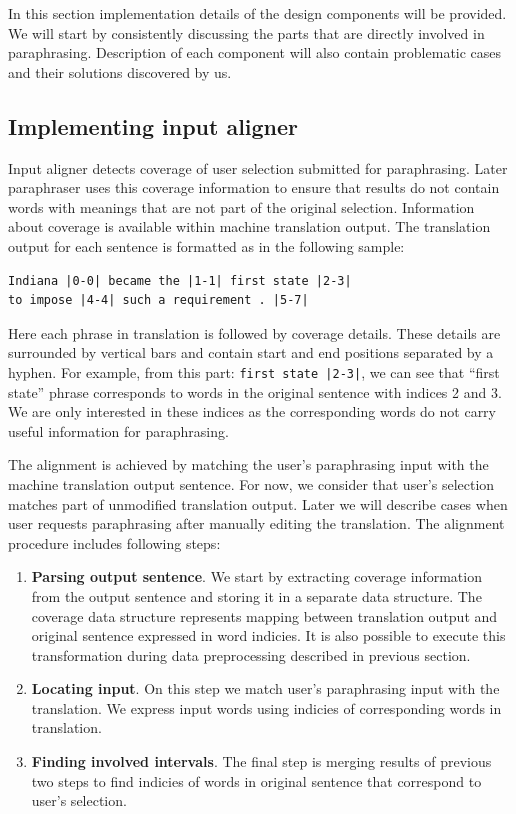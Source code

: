 In this section implementation details of the design components will be provided. We will start by consistently discussing the parts that are directly involved in paraphrasing. Description of each component will also contain problematic cases and their solutions discovered by us. 

\subsection{Implementing input aligner}

Input aligner detects coverage of user selection submitted for paraphrasing. Later paraphraser uses this coverage information to ensure that results do not contain words with meanings that are not part of the original selection. Information about coverage is available within machine translation output. The translation output for each sentence is formatted as in the following sample:

\begin{verbatim}
Indiana |0-0| became the |1-1| first state |2-3| 
to impose |4-4| such a requirement . |5-7|
\end{verbatim}

Here each phrase in translation is followed by coverage details. These details are surrounded by vertical bars and contain start and end positions separated by a hyphen. For example, from this part: \texttt{first state |2-3|}, we can see that ``first state'' phrase corresponds to words in the original sentence with indices 2 and 3. We are only interested in these indices as the corresponding words do not carry useful information for paraphrasing.

The alignment is achieved by matching the user's paraphrasing input with the machine translation output sentence. For now, we consider that user's selection matches part of unmodified translation output. Later we will describe cases when user requests paraphrasing after manually editing the translation. The alignment procedure includes following steps:

\begin{enumerate}
  \item \textbf{Parsing output sentence}. We start by extracting coverage information from the output sentence and storing it in a separate data structure. The coverage data structure represents mapping between translation output and original sentence expressed in word indicies. It is also possible to execute this transformation during data preprocessing described in previous section. 
  \item \textbf{Locating input}. On this step we match user's paraphrasing input with the translation. We express input words using indicies of corresponding words in translation.
  \item \textbf{Finding involved intervals}. The final step is merging results of previous two steps to find indicies of words in original sentence that correspond to user's selection. 
\end{enumerate}

